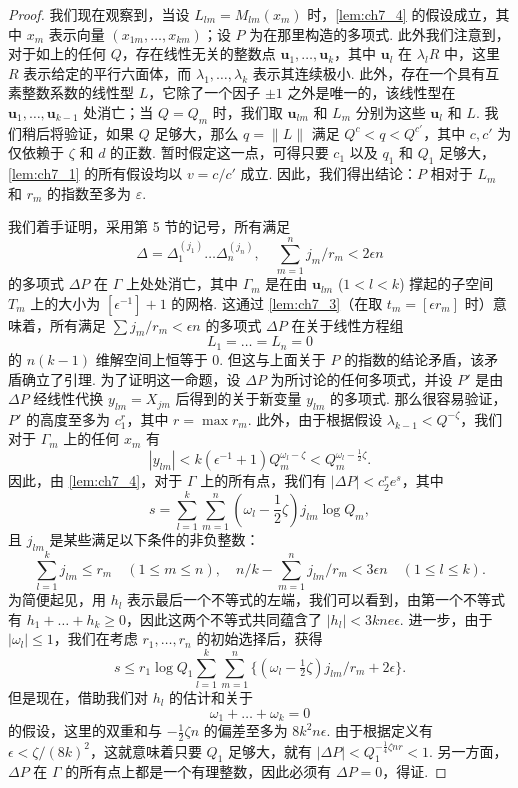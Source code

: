 \begin{proof}
我们现在观察到，当设 $L_{lm} = M_{lm}(x_m)$ 时，\autoref{lem:ch7_4} 的假设成立，其中 $x_m$ 表示向量 $(x_{1m},\dots,x_{km})$；设 $P$ 为在那里构造的多项式. 此外我们注意到，对于如上的任何 $Q$，存在线性无关的整数点 $\mathbf{u}_1, \dots, \mathbf{u}_k$，其中 $\mathbf{u}_l$ 在 $\lambda_l R$ 中，这里 $R$ 表示给定的平行六面体，而 $\lambda_1, \dots, \lambda_k$ 表示其连续极小. 此外，存在一个具有互素整数系数的线性型 $L$，它除了一个因子 $\pm 1$ 之外是唯一的，该线性型在 $\mathbf{u}_1, \dots, \mathbf{u}_{k-1}$ 处消亡；当 $Q = Q_m$ 时，我们取 $\mathbf{u}_{lm}$ 和 $L_m$ 分别为这些 $\mathbf{u}_l$ 和 $L$. 我们稍后将验证，如果 $Q$ 足够大，那么 $q = \|L\|$ 满足 $Q^c < q < Q^{c'}$，其中 $c, c'$ 为仅依赖于 $\zeta$ 和 $d$ 的正数. 暂时假定这一点，可得只要 $c_1$ 以及 $q_1$ 和 $Q_1$ 足够大，\autoref{lem:ch7_1} 的所有假设均以 $v = c/c'$ 成立. 因此，我们得出结论：$P$ 相对于 $L_m$ 和 $r_m$ 的指数至多为 $\varepsilon$.

我们着手证明，采用第 5 节的记号，所有满足
\[\Delta = \Delta_1^{(j_1)} \dots \Delta_n^{(j_n)}, \quad \sum_{m=1}^n j_m/r_m < 2\epsilon n\]
的多项式 $\Delta P$ 在 $\Gamma$ 上处处消亡，其中 $\Gamma_m$ 是在由 $\mathbf{u}_{lm}$ ($1 < l < k$) 撑起的子空间 $T_m$ 上的大小为 $[\epsilon^{-1}] + 1$ 的网格. 这通过 \autoref{lem:ch7_3}（在取 $t_m = [\epsilon r_m]$ 时）意味着，所有满足 $\sum j_m/r_m < \epsilon n$ 的多项式 $\Delta P$ 在关于线性方程组
\[L_1 = \dots = L_n = 0\]
的 $n(k-1)$ 维解空间上恒等于 0. 但这与上面关于 $P$ 的指数的结论矛盾，该矛盾确立了引理. 为了证明这一命题，设 $\Delta P$ 为所讨论的任何多项式，并设 $P'$ 是由 $\Delta P$ 经线性代换 $y_{lm} = X_{jm}$ 后得到的关于新变量 $y_{lm}$ 的多项式. 那么很容易验证，$P'$ 的高度至多为 $c_1^r$，其中 $r = \max r_m$. 此外，由于根据假设 $\lambda_{k-1} < Q^{-\zeta}$，我们对于 $\Gamma_m$ 上的任何 $x_m$ 有
\[|y_{lm}| < k(\epsilon^{-1}+1) Q_m^{\omega_l-\zeta} < Q_m^{\omega_l-\frac{1}{2}\zeta}.\]
因此，由 \autoref{lem:ch7_4}，对于 $\Gamma$ 上的所有点，我们有 $|\Delta P| < c_2^r e^s$，其中
\[s = \sum_{l=1}^{k} \sum_{m=1}^{n} (\omega_{l} - \frac{1}{2}\zeta) j_{lm} \log Q_{m},\]
且 $j_{lm}$ 是某些满足以下条件的非负整数：
\[\sum_{l=1}^{k} j_{lm} \leqslant r_{m} \quad (1 \leqslant m \leqslant n), \quad n/k - \sum_{m=1}^{n} j_{lm}/r_{m} < 3\epsilon n \quad (1 \leqslant l \leqslant k).\]
为简便起见，用 $h_l$ 表示最后一个不等式的左端，我们可以看到，由第一个不等式有 $h_1 + \ldots + h_k \ge 0$，因此这两个不等式共同蕴含了 $|h_l| < 3kne\epsilon$. 进一步，由于 $|\omega_l| \le 1$，我们在考虑 $r_1, \dots, r_n$ 的初始选择后，获得
\[s\leqslant r_1\log Q_1\sum_{l=1}^k\sum_{m=1}^n\{(\omega_l-\tfrac12\zeta)j_{lm}/r_m+2\epsilon\}.\]
但是现在，借助我们对 $h_l$ 的估计和关于
\[\omega_1 + \ldots + \omega_k = 0\]
的假设，这里的双重和与 $-\frac{1}{2}\zeta n$ 的偏差至多为 $8k^2n\epsilon$. 由于根据定义有 $\epsilon < \zeta/(8k)^2$，这就意味着只要 $Q_1$ 足够大，就有 $|\Delta P| < Q_1^{-\frac{1}{4}\zeta nr} < 1$. 另一方面，$\Delta P$ 在 $\Gamma$ 的所有点上都是一个有理整数，因此必须有 $\Delta P = 0$，得证.


\end{proof}
